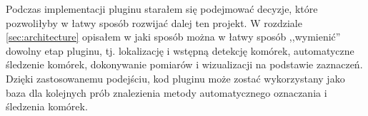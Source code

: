 \documentclass[declaration,shortabstract,mgr]{iithesis}
\begin{document}
Podczas implementacji pluginu starałem się podejmować decyzje, które pozwoliłyby w łatwy sposób rozwijać dalej ten projekt.
W rozdziale \ref{sec:architecture} opisałem w jaki sposób można w łatwy sposób ,,wymienić'' dowolny etap pluginu, tj. lokalizację i wstępną detekcję komórek, automatyczne śledzenie komórek, dokonywanie pomiarów i wizualizacji na podstawie zaznaczeń.
Dzięki zastosowanemu podejściu, kod pluginu może zostać wykorzystany jako baza dla kolejnych prób znalezienia metody automatycznego oznaczania i śledzenia komórek. 






\end{document}
